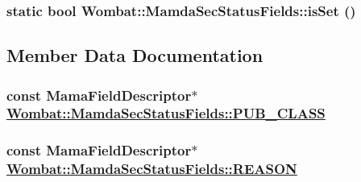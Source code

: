 \hypertarget{classWombat_1_1MamdaSecStatusFields_8fb0b970030599ffdba6ba1811d5d377}{
\subsubsection[isSet]{\setlength{\rightskip}{0pt plus 5cm}static bool Wombat::Mamda\-Sec\-Status\-Fields::is\-Set ()}}
\label{classWombat_1_1MamdaSecStatusFields_8fb0b970030599ffdba6ba1811d5d377}




\subsection{Member Data Documentation}
\hypertarget{classWombat_1_1MamdaSecStatusFields_cb411ef6db5eadef356f8eb09f752265}{
\subsubsection[PUB\_\-CLASS]{\setlength{\rightskip}{0pt plus 5cm}const Mama\-Field\-Descriptor$\ast$ \hyperlink{classWombat_1_1MamdaSecStatusFields_cb411ef6db5eadef356f8eb09f752265}{Wombat::Mamda\-Sec\-Status\-Fields::PUB\_\-CLASS}}}
\label{classWombat_1_1MamdaSecStatusFields_cb411ef6db5eadef356f8eb09f752265}


\hypertarget{classWombat_1_1MamdaSecStatusFields_14d9e1339db83fffe57a1e211f747456}{
\subsubsection[REASON]{\setlength{\rightskip}{0pt plus 5cm}const Mama\-Field\-Descriptor$\ast$ \hyperlink{classWombat_1_1MamdaSecStatusFields_14d9e1339db83fffe57a1e211f747456}{Wombat::Mamda\-Sec\-Status\-Fields::REASON}}}
\label{classWombat_1_1MamdaSecStatusFields_14d9e1339db83fffe57a1e211f747456}


